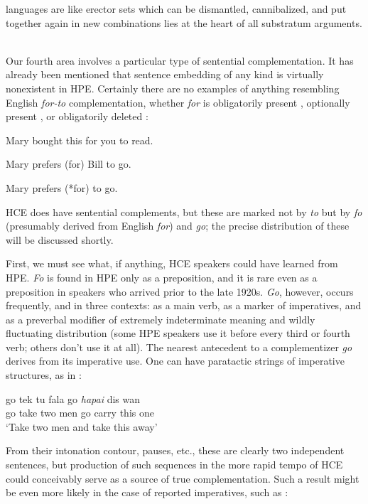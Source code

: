 languages are like erector sets which can be dismantled, cannibalized, and put together again in new combinations lies at the heart of all substratum arguments.\\\\ 

Our fourth area involves a particular type of sentential comple\-mentation. It has already been mentioned that sentence embedding of any kind is virtually nonexistent in HPE. Certainly there are no examples of anything resembling English \textit{for-to} complementation,
whether \textit{for} is obligatorily present , optionally present , or obligatorily deleted :

\ea\label{ex:56}
 Mary bought this for you to read.
\z

\ea\label{ex:57}
 Mary prefers (for) Bill to go.
\z

\ea\label{ex:58}
 Mary prefers (*for) to go.
\z

\noindent HCE does have sentential complements, but these are marked not by \textit{to} but by \textit{fo} (presumably derived from English \textit{for}) and \textit{go}; the precise distribution of these will be discussed shortly.

First, we must see what, if anything, HCE speakers could have learned from HPE. \textit{Fo} is found in HPE only as a preposition, and it is rare even as a preposition in speakers who arrived prior to the late 1920s. \textit{Go}, however, occurs frequently, and in three contexts: as a main verb, as a marker of imperatives, and as a preverbal modifier of extremely indeterminate meaning and wildly fluctuating distribution (some HPE speakers use it before every third or fourth verb; others don't use it at all). The nearest antecedent to a complementizer \textit{go} derives from its imperative use. One can have paratactic strings of imperative structures, as in :

\ea\label{ex:59}
\gll go tek tu fala go \textit{hapai} dis wan\\
go take two men go carry this one \\
\glt `Take two men and take this away'
\z

\noindent From their intonation contour, pauses, etc., these are clearly two independent sentences, but production of such sequences in the more rapid tempo of HCE could conceivably serve as a source of true comple\-mentation. Such a result might be even more likely in the case of reported imperatives, such as :

